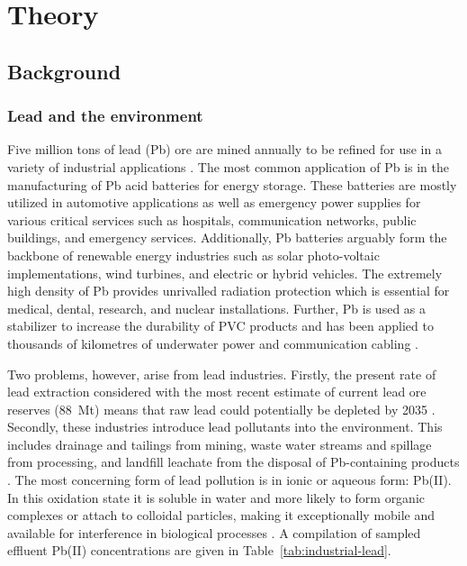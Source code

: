 \chapter{Theory}

\section{Background}

\subsection{Lead and the environment}

Five million tons of lead (Pb) ore are mined annually to be refined for use in a variety of industrial applications \parencite{ILA2019}. The most common application of Pb is in the manufacturing of Pb acid batteries for energy storage. These batteries are mostly utilized in automotive applications as well as emergency power supplies for various critical services such as hospitals, communication networks, public buildings, and emergency services. Additionally, Pb batteries arguably form the backbone of renewable energy industries such as solar photo-voltaic implementations, wind turbines, and electric or hybrid vehicles. The extremely high density of Pb provides unrivalled radiation protection which is essential for medical, dental, research, and nuclear installations. Further, Pb is used as a stabilizer to increase the durability of PVC products and has been applied to thousands of kilometres of underwater power and communication cabling \parencite{ILA2019}.

Two problems, however, arise from lead industries. Firstly, the present rate of lead extraction considered with the most recent estimate of current lead ore reserves (\SI{88}{\mega\tonne}) means that raw lead could potentially be depleted by 2035 \parencite{Statista2019}. Secondly, these industries introduce lead pollutants into the environment. This includes drainage and tailings from mining, waste water streams and spillage from processing, and landfill leachate from the disposal of Pb-containing products \parencite{UNEP2010, VanHille}. The most concerning form of lead pollution is in ionic or aqueous form: Pb(II). In this oxidation state it is soluble in water and more likely to form organic complexes or attach to colloidal particles, making it exceptionally mobile and available for interference in biological processes \parencite{Naik2013}. A compilation of sampled effluent Pb(II) concentrations are given in Table~\ref{tab:industrial-lead}. 

